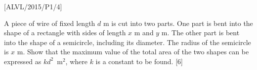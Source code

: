 \item {[}ALVL/2015/P1/4{]}

A piece of wire of fixed length $d$ m is cut into two parts. One
part is bent into the shape of a rectangle with sides of length $x$
m and $y$ m. The other part is bent into the shape of a semicircle,
including its diameter. The radius of the semicircle is $x$ m. Show
that the maximum value of the total area of the two shapes can be
expressed as $kd^{2}$~$\mathrm{m}^{2}$, where $k$ is a constant
to be found. {[}6{]}
